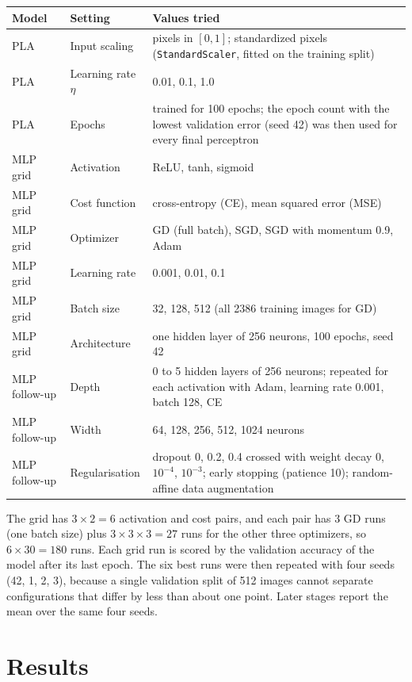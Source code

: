 \documentclass[12pt,a4paper]{article}
\begin{document}
\begin{longtable}{p{3.0cm}p{3.2cm}p{8.0cm}}
\toprule
Model & Setting & Values tried \\
\midrule
PLA & Input scaling & pixels in $[0,1]$; standardized pixels (\texttt{StandardScaler}, fitted on the
training split) \\
PLA & Learning rate $\eta$ & 0.01, 0.1, 1.0 \\
PLA & Epochs & trained for 100 epochs; the epoch count with the lowest validation error (seed 42)
was then used for every final perceptron \\
MLP grid & Activation & ReLU, tanh, sigmoid \\
MLP grid & Cost function & cross-entropy (CE), mean squared error (MSE) \\
MLP grid & Optimizer & GD (full batch), SGD, SGD with momentum 0.9, Adam \\
MLP grid & Learning rate & 0.001, 0.01, 0.1 \\
MLP grid & Batch size & 32, 128, 512 (all 2386 training images for GD) \\
MLP grid & Architecture & one hidden layer of 256 neurons, 100 epochs, seed 42 \\
MLP follow-up & Depth & 0 to 5 hidden layers of 256 neurons; repeated for each activation with
Adam, learning rate 0.001, batch 128, CE \\
MLP follow-up & Width & 64, 128, 256, 512, 1024 neurons \\
MLP follow-up & Regularisation & dropout 0, 0.2, 0.4 crossed with weight decay 0, $10^{-4}$,
$10^{-3}$; early stopping (patience 10); random-affine data augmentation \\
\bottomrule
\end{longtable}

The grid has $3 \times 2 = 6$ activation and cost pairs, and each pair has $3$ GD runs (one batch
size) plus $3 \times 3 \times 3 = 27$ runs for the other three optimizers, so $6 \times 30 = 180$
runs. Each grid run is scored by the validation accuracy of the model after its last epoch. The
six best runs were then repeated with four seeds (42, 1, 2, 3), because a single validation split
of 512 images cannot separate configurations that differ by less than about one point. Later
stages report the mean over the same four seeds.

\section{Results}
\end{document}
